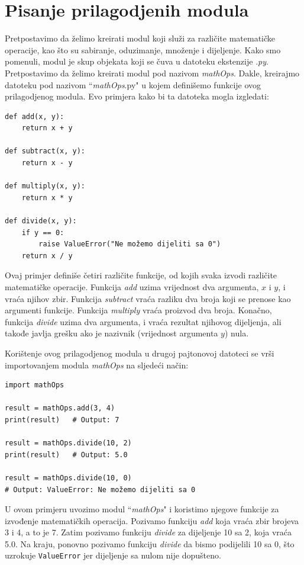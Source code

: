  
\section{Pisanje prilagodjenih modula}

Pretpostavimo da želimo kreirati modul koji služi za različite matematičke operacije, kao što su sabiranje, oduzimanje, množenje i dijeljenje. Kako smo pomenuli, modul je skup objekata koji se  čuva u datoteku ekstenzije .\textit{py}. Pretpostavimo da želimo kreirati modul pod nazivom \textit{mathOps}. Dakle, kreirajmo  datoteku pod nazivom ``\textit{mathOps}.py" u kojem definišemo funkcije ovog prilagodjenog modula. Evo primjera kako bi ta datoteka mogla izgledati:

\begin{verbatim}
def add(x, y):
    return x + y

def subtract(x, y):
    return x - y

def multiply(x, y):
    return x * y

def divide(x, y):
    if y == 0:
        raise ValueError("Ne možemo dijeliti sa 0")
    return x / y
\end{verbatim}
Ovaj  primjer definiše četiri različite funkcije, od kojih svaka izvodi različite matematičke operacije. Funkcija \textit{add} uzima vrijednost dva argumenta, $x$ i $y$, i vraća njihov zbir. Funkcija \textit{subtract}   vraća razliku dva broja koji se prenose kao argumenti funkcije. Funkcija \textit{multiply} vraća proizvod dva broja. Konačno, funkcija \textit{divide} uzima dva argumenta, i vraća rezultat njihovog dijeljenja, ali takođe  javlja  grešku ako je nazivnik (vrijednost argumenta $y$) nula.

Korištenje ovog prilagodjenog modula u drugoj pajtonovoj datoteci se vrši importovanjem modula \textit{mathOps} na sljedeći način:

\begin{verbatim}
import mathOps

result = mathOps.add(3, 4)
print(result)   # Output: 7

result = mathOps.divide(10, 2)
print(result)   # Output: 5.0

result = mathOps.divide(10, 0)
# Output: ValueError: Ne možemo dijeliti sa 0
\end{verbatim}

U ovom primjeru uvozimo modul ``\textit{mathOps}" i koristimo njegove funkcije za izvođenje matematičkih operacija. Pozivamo funkciju  \textit{add}  koja vraća zbir brojeva 3 i 4, a to je 7. Zatim pozivamo funkciju  \textit{divide}  za dijeljenje 10 sa 2, koja vraća 5.0. Na kraju, ponovno pozivamo funkciju  \textit{divide}  da bismo podijelili 10 sa 0, što uzrokuje \texttt{ValueError} jer dijeljenje sa nulom nije dopušteno.


